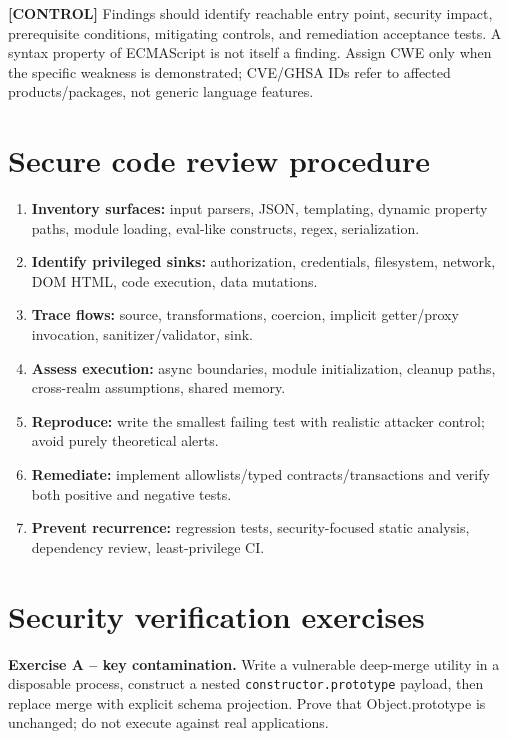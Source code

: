 \documentclass[11pt,letterpaper]{article}
\providecommand{\tightlist}{\setlength{\itemsep}{0pt}\setlength{\parskip}{0pt}}
\newcommand{\passthrough}[1]{#1}
\begin{document}
\textbf{{[}CONTROL{]}} Findings should identify reachable entry point, security impact, prerequisite conditions, mitigating controls, and remediation acceptance tests. A syntax property of ECMAScript is not itself a finding. Assign CWE only when the specific weakness is demonstrated; CVE/GHSA IDs refer to affected products/packages, not generic language features.

\section{Secure code review procedure}\label{secure-code-review-procedure}

\begin{enumerate}
\def\labelenumi{\arabic{enumi}.}
\tightlist
\item
  \textbf{Inventory surfaces:} input parsers, JSON, templating, dynamic property paths, module loading, eval-like constructs, regex, serialization.
\item
  \textbf{Identify privileged sinks:} authorization, credentials, filesystem, network, DOM HTML, code execution, data mutations.
\item
  \textbf{Trace flows:} source, transformations, coercion, implicit getter/proxy invocation, sanitizer/validator, sink.
\item
  \textbf{Assess execution:} async boundaries, module initialization, cleanup paths, cross-realm assumptions, shared memory.
\item
  \textbf{Reproduce:} write the smallest failing test with realistic attacker control; avoid purely theoretical alerts.
\item
  \textbf{Remediate:} implement allowlists/typed contracts/transactions and verify both positive and negative tests.
\item
  \textbf{Prevent recurrence:} regression tests, security-focused static analysis, dependency review, least-privilege CI.
\end{enumerate}

\section{Security verification exercises}\label{security-verification-exercises}

\textbf{Exercise A -- key contamination.} Write a vulnerable deep-merge utility in a disposable process, construct a nested \passthrough{\lstinline!constructor.prototype!} payload, then replace merge with explicit schema projection. Prove that Object.prototype is unchanged; do not execute against real applications.
\end{document}
